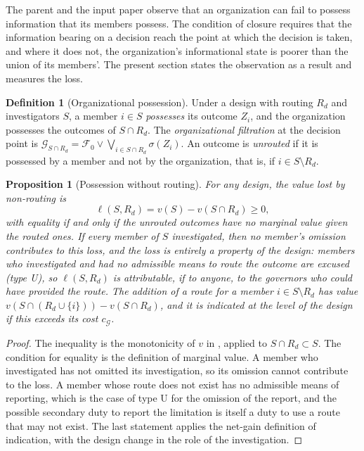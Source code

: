 \documentclass[11pt]{article}
\newcommand{\F}{\mathcal F}
\newcommand{\G}{\mathcal G}
\theoremstyle{plain}
\newtheorem{proposition}{Proposition}
\theoremstyle{definition}
\newtheorem{definition}{Definition}
\begin{document}
The parent and the input paper \cite{flyxion2026inputs} observe that an organization can fail to possess information that its members possess. The condition of closure requires that the information bearing on a decision reach the point at which the decision is taken, and where it does not, the organization's informational state is poorer than the union of its members'. The present section states the observation as a result and measures the loss.

\begin{definition}[Organizational possession]\label{def:possession}
Under a design with routing $R_d$ and investigators $S$, a member $i\in S$ \emph{possesses} its outcome $Z_i$, and the organization possesses the outcomes of $S\cap R_d$. The \emph{organizational filtration} at the decision point is $\G_{S\cap R_d}=\F_0\vee\bigvee_{i\in S\cap R_d}\sigma(Z_i)$. An outcome is \emph{unrouted} if it is possessed by a member and not by the organization, that is, if $i\in S\setminus R_d$.
\end{definition}

\begin{proposition}[Possession without routing]\label{prop:routing}
For any design, the value lost by non-routing is
\[
\ell(S,R_d)=v(S)-v(S\cap R_d)\ge0,
\]
with equality if and only if the unrouted outcomes have no marginal value given the routed ones. If every member of $S$ investigated, then no member's omission contributes to this loss, and the loss is entirely a property of the design: members who investigated and had no admissible means to route the outcome are excused (type U), so $\ell(S,R_d)$ is attributable, if to anyone, to the governors who could have provided the route. The addition of a route for a member $i\in S\setminus R_d$ has value $v(S\cap(R_d\cup\{i\}))-v(S\cap R_d)$, and it is indicated at the level of the design if this exceeds its cost $c_{\mathcal G}$.
\end{proposition}

\begin{proof}
The inequality is the monotonicity of $v$ in \cite{flyxion2026shared}, applied to $S\cap R_d\subset S$. The condition for equality is the definition of marginal value. A member who investigated has not omitted its investigation, so its omission cannot contribute to the loss. A member whose route does not exist has no admissible means of reporting, which is the case of type U for the omission of the report, and the possible secondary duty to report the limitation is itself a duty to use a route that may not exist. The last statement applies the net-gain definition of indication, with the design change in the role of the investigation.
\end{proof}
\end{document}
